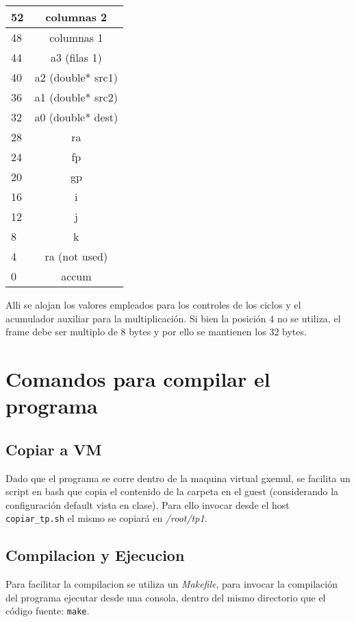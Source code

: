 \documentclass[10pt,a4paper]{article}
\begin{document}
	\begin{center}
			{\footnotesize \begin{tabular}{ |l|c| }

			\hline
				52 & columnas 2 \\ \hline
				48 & columnas 1 \\ \hline	
				44 & a3 (filas 1) \\ \hline
				40 & a2 (double* src1) \\ \hline
				36 & a1 (double* src2) \\ \hline
				32 & a0 (double* dest) \\ \hline
				28 & ra \\ \hline
				24 & fp \\ \hline
				20 & gp \\ \hline
				16 & i \\ \hline
				12 & j \\ \hline
				8 & k \\ \hline
				4 & ra (not used) \\ \hline
				0 & accum \\ \hline
				
			\end{tabular}}\label{tab:regtension}
	\end{center}

Alli se alojan los valores empleados para los controles de los ciclos y el acumulador auxiliar para la multiplicación. Si bien la posición 4 no se utiliza, el frame debe ser multiplo de 8 bytes y por ello se mantienen los 32 bytes.

\section{Comandos para compilar el programa}
	\subsection{Copiar a VM}
		Dado que el programa se corre dentro de la maquina virtual gxemul, se facilita un script en bash que copia el contenido de la carpeta en el guest (considerando la configuración default vista en clase). Para ello invocar desde el host \texttt{copiar\_tp.sh} el mismo se copiará en \textit{/root/tp1}.

	\subsection{Compilacion y Ejecucion}
		Para facilitar la compilacion se utiliza un \textit{Makefile}, para invocar la compilación del programa ejecutar desde una consola, dentro del mismo directorio que el código fuente: \texttt{make}.
\end{document}
